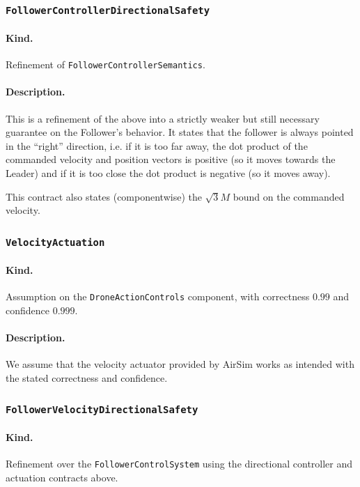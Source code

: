 \documentclass{article}
\begin{document}
\subsubsection{\texttt{FollowerControllerDirectionalSafety}}

\paragraph{Kind.} Refinement of \texttt{FollowerControllerSemantics}.

\paragraph{Description.} This is a refinement of the above into a strictly weaker but still necessary guarantee on the Follower's behavior. It states that the follower is always pointed in the ``right'' direction, i.e. if it is too far away, the dot product of the commanded velocity and position vectors is positive (so it moves towards the Leader) and if it is too close the dot product is negative (so it moves away). 

This contract also states (componentwise) the $\sqrt3 M$ bound on the commanded velocity. 

\subsubsection{\texttt{VelocityActuation}}

\paragraph{Kind.} Assumption on the \texttt{DroneActionControls} component, with correctness $0.99$ and confidence $0.999$.

\paragraph{Description.} We assume that the velocity actuator provided by AirSim works as intended with the stated correctness and confidence. 

\subsubsection{\texttt{FollowerVelocityDirectionalSafety}}

\paragraph{Kind.} Refinement over the \texttt{FollowerControlSystem} using the directional controller and actuation contracts above.
\end{document}
